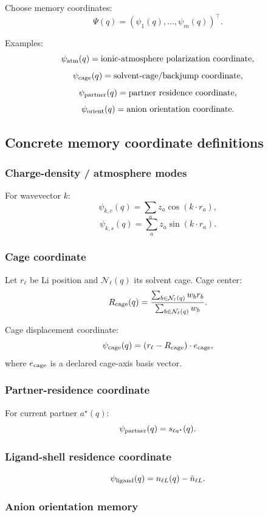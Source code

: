 \documentclass[11pt]{article}
\begin{document}
Choose memory coordinates:
\[
\Psi(q)
=
(\psi_1(q),\ldots,\psi_m(q))^\top.
\]

Examples:
\[
\psi_{\rm atm}(q)
=
\text{ionic-atmosphere polarization coordinate},
\]
\[
\psi_{\rm cage}(q)
=
\text{solvent-cage/backjump coordinate},
\]
\[
\psi_{\rm partner}(q)
=
\text{partner residence coordinate},
\]
\[
\psi_{\rm orient}(q)
=
\text{anion orientation coordinate}.
\]

\subsection{Concrete memory coordinate definitions}

\subsubsection{Charge-density / atmosphere modes}

For wavevector \(k\):
\[
\psi_{k,c}(q)=
\sum_a z_a\cos(k\cdot r_a),
\]
\[
\psi_{k,s}(q)=
\sum_a z_a\sin(k\cdot r_a).
\]

\subsubsection{Cage coordinate}

Let \(r_\ell\) be Li position and \(\mathcal N_\ell(q)\) its solvent cage.
Cage center:
\[
R_{\rm cage}(q)
=
\frac{\sum_{b\in\mathcal N_\ell(q)}w_b r_b}
{\sum_{b\in\mathcal N_\ell(q)}w_b}.
\]

Cage displacement coordinate:
\[
\psi_{\rm cage}(q)=
(r_\ell-R_{\rm cage})\cdot e_{\rm cage},
\]
where \(e_{\rm cage}\) is a declared cage-axis basis vector.

\subsubsection{Partner-residence coordinate}

For current partner \(a^\star(q)\):
\[
\psi_{\rm partner}(q)
=
s_{\ell a^\star}(q).
\]

\subsubsection{Ligand-shell residence coordinate}

\[
\psi_{\rm ligand}(q)
=
n_{\ell L}(q)-\bar n_{\ell L}.
\]

\subsubsection{Anion orientation memory}
\end{document}
